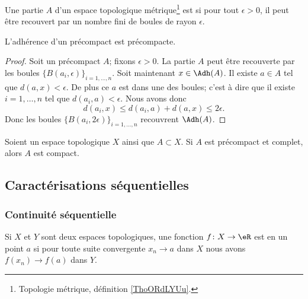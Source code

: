 \begin{definition}	\label{DEFooLZDTooZlAtdL}
	Une partie \( A\) d'un espace topologique métrique\footnote{Topologie métrique, définition \ref{ThoORdLYUu}.} est  si pour tout \( \epsilon>0\), il peut être recouvert par un nombre fini de boules de rayon \( \epsilon\).
\end{definition}

\begin{proposition}	\label{PROPooDWUDooGrgZpP}
	L'adhérence d'un précompact est précompacte.
\end{proposition}

\begin{proof}
	Soit un précompact \( A\); fixons \( \epsilon>0\). La partie \( A\) peut être recouverte par les boules \( \{ B(a_i,\epsilon) \}_{i=1,\ldots,n}\). Soit maintenant \( x\in\Adh(A)\). Il existe \( a\in A\) tel que \( d(a,x)<\epsilon\). De plus ce \( a\) est dans une des boules; c'est à dire que il existe \( i=1,\ldots,n\) tel que \( d(a_i,a)<\epsilon\). Nous avons donc
	\begin{equation}
		d(a_i,x)\leq d(a_i,a)+d(a,x)\leq 2\epsilon.
	\end{equation}
	Donc les boules \( \{ B(a_i,2\epsilon) \}_{i=1,\ldots,n}\) recouvrent \( \Adh(A)\).
\end{proof}

\begin{proposition}	\label{PROPooZRXDooUyFBFG}
	Soient un espace topologique \( X\) ainsi que \( A\subset X\). Si \( A\) est précompact et complet, alors \( A\) est compact.
\end{proposition}



\subsection{Caractérisations séquentielles}


\subsubsection{Continuité séquentielle}

\begin{definition}  \label{DefENioICV}
	Si \( X\) et \( Y \) sont deux espaces topologiques, une fonction \( f\colon X\to \eR\) est  en un point \( a\) si pour toute suite convergente \( x_n\to a\) dans \( X\) nous avons \( f(x_n)\to f(a)\) dans \( Y\).
\end{definition}




